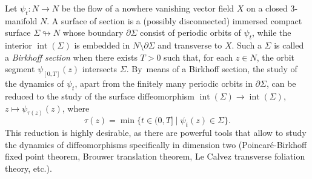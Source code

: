 \documentclass[JEP,XML,SOM,Unicode,NoFloatCountersInSection,published]{cedram}
\let\sep\mid
\DeclareMathOperator{\interior}{int}
\theoremstyle{plain}
\theoremstyle{definition}
\begin{document}
Let $\psi_t:N\to N$ be the flow of a nowhere vanishing vector field $X$ on a closed 3-manifold $N$. A surface of section is a (possibly disconnected) immersed compact surface $\Sigma \looparrowright N$ whose boundary $\partial \Sigma$ consist of periodic orbits of $\psi_t$, while the interior $\interior(\Sigma)$ is embedded in $N \setminus \partial \Sigma$ and transverse to $X$. Such a $\Sigma$ is called a \emph{Birkhoff section} when there exists $T>0$ such that, for each $z\in N$, the orbit segment $\psi_{[0,T]}(z)$ intersects $\Sigma$. By~means of a Birkhoff section, the study of the dynamics of $\psi_t$, apart from the finitely many periodic orbits in $\partial\Sigma$, can be reduced to the study of the surface diffeomorphism $\interior(\Sigma)\to\interior(\Sigma)$, $z\mapsto\psi_{\tau(z)}(z)$, where\vspace*{-3pt}
\[
\tau(z)=\min\big\{t\in(0,T]\sep \psi_t(z)\in\Sigma \big\}.
\]
This reduction is highly desirable, as there are powerful tools that allow to study the dynamics of diffeomorphisms specifically in dimension two (\eg Poincaré-Birkhoff fixed point theorem, Brouwer translation theorem, Le Calvez transverse foliation theory, etc.).
\end{document}
